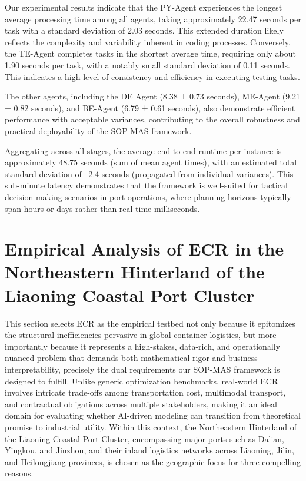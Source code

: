 \documentclass[preprint,12pt]{elsarticle}
\begin{document}
Our experimental results indicate that the PY-Agent experiences the longest average processing time among all agents, taking approximately 22.47 seconds per task with a standard deviation of 2.03 seconds. This extended duration likely reflects the complexity and variability inherent in coding processes. Conversely, the TE-Agent completes tasks in the shortest average time, requiring only about 1.90 seconds per task, with a notably small standard deviation of 0.11 seconds. This indicates a high level of consistency and efficiency in executing testing tasks.

The other agents, including the DE Agent (8.38 ± 0.73 seconds), ME-Agent (9.21 ± 0.82 seconds), and BE-Agent (6.79 ± 0.61 seconds), also demonstrate efficient performance with acceptable variances, contributing to the overall robustness and practical deployability of the SOP-MAS framework.

Aggregating across all stages, the average end-to-end runtime per instance is approximately 48.75 seconds (sum of mean agent times), with an estimated total standard deviation of ~2.4 seconds (propagated from individual variances). This sub-minute latency demonstrates that the framework is well-suited for tactical decision-making scenarios in port operations, where planning horizons typically span hours or days rather than real-time milliseconds.

\section{Empirical Analysis of ECR in the Northeastern Hinterland of the Liaoning Coastal Port Cluster}

This section selects ECR as the empirical testbed not only because it epitomizes the structural inefficiencies pervasive in global container logistics, but more importantly because it represents a high-stakes, data-rich, and operationally nuanced problem that demands both mathematical rigor and business interpretability, precisely the dual requirements our SOP-MAS framework is designed to fulfill. Unlike generic optimization benchmarks, real-world ECR involves intricate trade-offs among transportation cost, multimodal transport, and contractual obligations across multiple stakeholders, making it an ideal domain for evaluating whether AI-driven modeling can transition from theoretical promise to industrial utility. Within this context, the Northeastern Hinterland of the Liaoning Coastal Port Cluster, encompassing major ports such as Dalian, Yingkou, and Jinzhou, and their inland logistics networks across Liaoning, Jilin, and Heilongjiang provinces, is chosen as the geographic focus for three compelling reasons.
\end{document}
